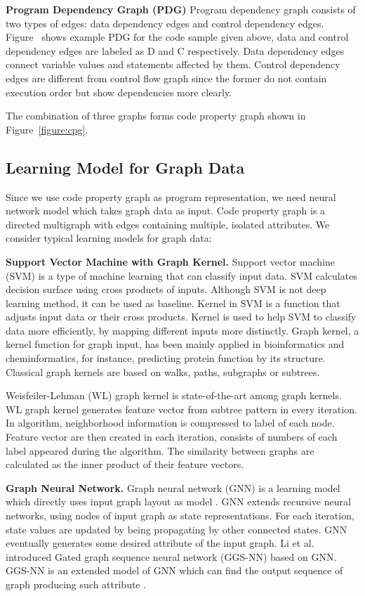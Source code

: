 \textbf{Program Dependency Graph (PDG)}
Program dependency graph consists of two types of edges: data dependency edges and control dependency edges.
Figure~ shows example PDG for the code sample given above, data and control dependency edges are labeled as D and C respectively.
Data dependency edges connect variable values and statements affected by them.
Control dependency edges are different from control flow graph since the former do not contain execution order but show dependencies more clearly.

The combination of three graphs forms code property graph shown in Figure~\ref{figure:cpg}.

\subsection{Learning Model for Graph Data}

Since we use code property graph as program representation, we need neural network model which takes graph data as input.
Code property graph is a directed multigraph with edges containing multiple, isolated attributes.
We consider typical learning models for graph data:

\textbf{Support Vector Machine with Graph Kernel.}
Support vector machine (SVM) is a type of machine learning that can classify input data.
SVM calculates decision surface using cross products of inputs.
Although SVM is not deep learning method, it can be used as baseline.
Kernel in SVM is a function that adjusts input data or their cross products.
Kernel is used to help SVM to classify data more efficiently, by mapping different inputs more distinctly.
Graph kernel, a kernel function for graph input, has been mainly applied in bioinformatics and cheminformatics, for instance, predicting protein function by its structure.
Classical graph kernels are based on walks, paths, subgraphs or subtrees.

Weisfeiler-Lehman (WL) graph kernel \cite{shervashidze2011weisfeiler} is state-of-the-art among graph kernels.
WL graph kernel generates feature vector from subtree pattern in every iteration.
In algorithm, neighborhood information is compressed to label of each node.
Feature vector are then created in each iteration, consists of numbers of each label appeared during the algorithm.
The similarity between graphs are calculated as the inner product of their feature vectors.

\textbf{Graph Neural Network.}
Graph neural network (GNN) is a learning model which directly uses input graph layout as model \cite{gori2005new}.
GNN extends recursive neural networks, using nodes of input graph as state representations.
For each iteration, state values are updated by being propagating by other connected states.
GNN eventually generates some desired attribute of the input graph.
Li et al. introduced Gated graph sequence neural network (GGS-NN) based on GNN.
GGS-NN is an extended	 model of GNN which can find the output sequence of graph producing such attribute \cite{li2015gated}.

